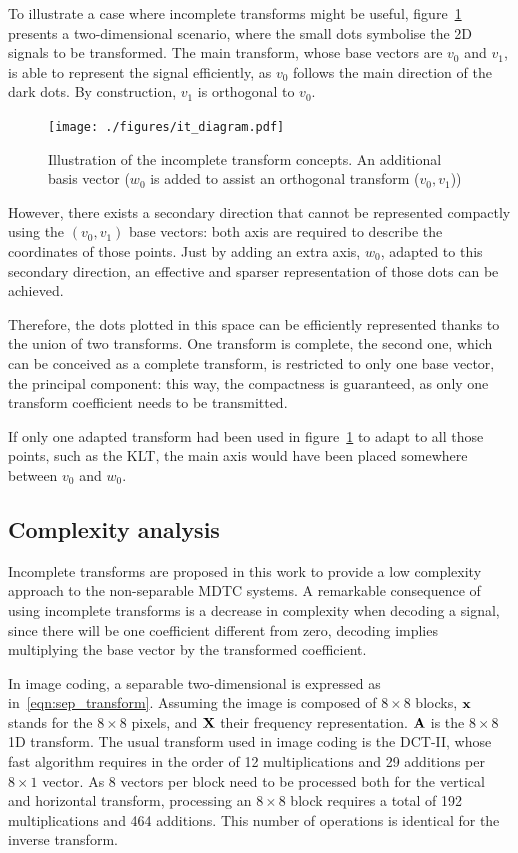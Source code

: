 \documentclass[11pt,a4paper,openright,twoside]{book}
\numberwithin{equation}{section} %
\numberwithin{figure}{section} %
\numberwithin{table}{section} %
\begin{document}
To illustrate a case where incomplete transforms might be useful,
figure~\ref{fig:it_diagram} presents a two-dimensional scenario, where the
small dots symbolise the 2D signals to be transformed.
The main transform, whose base vectors are $v_0$ and $v_1$, is able to
represent the signal efficiently, as $v_0$ follows the main direction of the
dark dots.
By construction, $v_1$ is orthogonal to $v_0$.

\begin{figure}[tp]
	\centering
	\texttt{[image: ./figures/it\_diagram.pdf]}
	\caption[Illustration of the incomplete transform concepts]
	{Illustration of the incomplete transform concepts.
	An additional basis vector ($w_0$ is added to assist an orthogonal
	transform ($v_0,v_1$))}
	\label{fig:it_diagram}
\end{figure}

However, there exists a secondary direction that cannot be represented
compactly using the $(v_0,v_1)$ base vectors:
both axis are required to describe the coordinates of those points.
Just by adding an extra axis, $w_0$, adapted to this secondary direction, an
effective and sparser representation of those dots can be achieved.

Therefore, the dots plotted in this space can be efficiently represented thanks
to the union of two transforms.
One transform is complete, the second one, which can be conceived as a
complete transform, is restricted to only one base vector, the principal
component:
this way, the compactness is guaranteed, as only one transform coefficient
needs to be transmitted.

If only one adapted transform had been used in figure~\ref{fig:it_diagram}
to adapt to all those points, such as the \acl{KLT}, the main axis would have
been placed somewhere between $v_0$ and $w_0$.

\subsection{Complexity analysis}
\label{sub:it_complexity_analysis}

Incomplete transforms are proposed in this work to provide a low complexity
approach to the non-separable \ac{MDTC} systems.
A remarkable consequence of using incomplete transforms is a decrease in
complexity when decoding a signal, since there will be one coefficient
different from zero, decoding implies multiplying the base vector by the
transformed coefficient.

In image coding, a separable two-dimensional is expressed as
in~\eqref{eqn:sep_transform}.
Assuming the image is composed of $8\times8$ blocks, $\mathbf{x}$ stands for the
$8\times8$ pixels, and $\mathbf{X}$ their frequency representation.
$\mathbf{A}$ is the $8\times8$ 1D transform.
The usual transform used in image coding is the \ac{DCT}-II, whose fast
algorithm requires in the order of 12 multiplications and 29 additions per
$8\times1$ vector.
As $8$ vectors per block need to be processed both for the vertical and
horizontal transform, processing an $8\times8$ block requires a total of 192
multiplications and 464 additions.
This number of operations is identical for the inverse transform.
\end{document}
